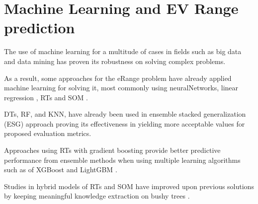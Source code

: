 \section{Machine Learning and EV Range prediction}

The use of machine learning for a multitude
of cases \citep{machineLearningCaseStudy} in fields such as 
big data \citep{machineLearningBigData, machineLearningBigData2}
and data mining \citep{businessDataMining} has 
proven its robustness on solving complex problems.

As a result, some approaches for the \gls{eRange}
problem have already applied machine learning 
for solving it, most commonly using \gls{neuralNetworks}, 
linear regression \citep{eRangeMachineLearningNeuralnetworkMLR},
\gls{RTs} and \gls{SOM} \citep{eRangeMachineLearningGHSOM}.

\gls{DTs}, \gls{RF}, and \gls{KNN}, have already been 
used in ensemble stacked generalization (ESG) approach 
\citep{eRangeMachineLearningEnsemble} proving its 
effectiveness in yielding more acceptable values
for proposed evaluation metrics.

Approaches using \gls{RTs} with gradient boosting 
provide better predictive performance from
ensemble methods when using multiple learning algorithms
such as of \gls{XGBoost} and \gls{LightGBM}
\citep{machineLearningERangeGradientBoostRts}.

Studies in hybrid models of \gls{RTs} and \gls{SOM} 
have improved upon previous solutions by
keeping meaningful knowledge extraction on bushy trees
\citep{machineLearningERangeSOMandRts}.

